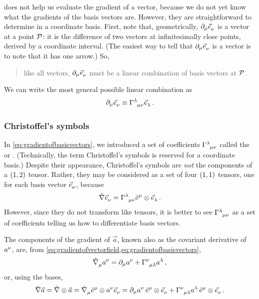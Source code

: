   does not help us evaluate the gradient of a vector, because we do not yet know what the gradients of the basis vectors are. However, they are straightforward to determine in a coordinate basis. First, note that, geometrically, $\ipd\mu\tbvec\nu$ is a vector at a point $\mathcal{P}$: it is the difference of two vectors at infinitesimally close points, derived by a coordinate interval. (The easiest way to tell that $\ipd\mu\tbvec\nu$ is a vector is to note that it has one arrow.) So, 
%
\begin{quotation}
  like all vectors, $\ipd\mu\tbvec\nu$ must be a linear combination of basis vectors at $\mathcal{P}$.
\end{quotation}
%
We can write the most general possible linear combination as
%
\begin{equation}\label{eq:gradientofbasisvectors}
  \ipd\mu\tbvec\nu \defas \tchris\lambda\mu\nu\tbvec\lambda\,.
\end{equation}


\subsubsection{Christoffel's symbols}
%
 In \cref{eq:gradientofbasisvectors}, we introduced a set of coefficients $\tchris\lambda\mu\nu$ called the  or . (Technically, the term Christoffel's symbols is reserved for a coordinate basis.) Despite their appearance, Christoffel's symbols are \emph{not} the components of a $\torder 12$ tensor. Rather, they may be considered as a set of four $\torder 11$ tensors, one for each basis vector $\tbvec\nu$, because
%
\begin{equation*}
  \gradcov\tbvec\nu = \tchris\lambda\mu\nu\tbcov\mu\tprod\tbvec\lambda\,.
\end{equation*}
%
However, since they do not transform like tensors, it is better to see $\tchris\lambda\mu\nu$ as a set of coefficients telling us how to differentiate basis vectors.

 The components of the gradient of $\vec a$, known also as the covariant derivative of $\tvec a\nu$, are, from \cref{eq:gradientofvectorfield,eq:gradientofbasisvectors},
%
\begin{equation}\label{eq:componentsofthegradientofavector}
  \tgradcov\mu\tvec a\nu = \ipd\mu\tvec a\nu + \tchris\nu\mu\lambda\tvec a\lambda\,,
\end{equation}
%
or, using the bases,
%
\begin{equation*}
  \gradcov\vec a = \gradcov\tprod\vec a
                = \tgradcov\mu\tbcov\mu\tprod\tvec a\nu\tbvec\nu
                = \ipd\mu\tvec a\nu\,\tbcov\mu\tprod\tbvec\nu 
                  + \tchris\nu\mu\lambda\tvec a\lambda\,\tbcov\mu\tprod\tbvec\nu\,.
\end{equation*}

